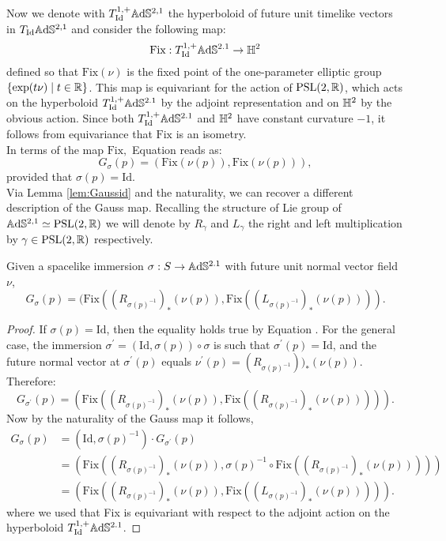 Now we denote with $T_{\text{Id}}^{1,+}\mathbb{A}\mathrm{d}\mathbb{S}^{2,1}$ the hyperboloid of future unit timelike vectors in $T_{\text{Id}}\mathbb{A}\mathrm{d}\mathbb{S}^{2,1}$ and consider the following map: 
\[
    \text{Fix}:T_{\text{Id}}^{1,+}\mathbb{A}\mathrm{d}\mathbb{S}^{2.1}\to\mathbb{H}^2
\]
defined so that $\text{Fix}(\nu)$ is the fixed point of the one-parameter elliptic group $\{\exp(t\nu)\;|\;t\in\mathbb{R}\}$. This map is equivariant for the action of $\text{PSL}(2,\mathbb{R})$, which acts on the hyperboloid $T_{\text{Id}}^{1,+}\mathbb{A}\mathrm{d}\mathbb{S}^{2.1}$ by the adjoint representation and on $\mathbb{H}^2$ by the obvious action. Since both $T_{\text{Id}}^{1,+}\mathbb{A}\mathrm{d}\mathbb{S}^{2.1}$ and $\mathbb{H}^2$ have constant curvature $-1$, it follows from equivariance that $\text{Fix}$ is an isometry.  \\
In terms of the map $\text{Fix},$ Equation  reads as: 
\begin{equation}\label{eq:Gaussfix}
    G_\sigma(p)=(\text{Fix}(\nu(p)),\text{Fix}(\nu(p))),
\end{equation}
provided that $\sigma(p)=\text{Id}.$\\ Via Lemma \ref{lem:Gaussid} and the naturality, we can recover a different description of the Gauss map. Recalling the structure of Lie group of $\mathbb{A}\mathrm{d}\mathbb{S}^{2,1}\simeq\text{PSL}(2,\mathbb{R})$ we will denote by $R_{\gamma } $ and $L_{\gamma} $ the right and left multiplication by $\gamma\in\text{PSL}(2,\mathbb{R})$ respectively. 

\begin{lemma}
    Given a spacelike immersion $\sigma: S\to \mathbb{A}\mathrm{d}\mathbb{S}^{2.1}$ with future unit normal vector field $\nu$,
    \[
        G_\sigma(p)=(\text{Fix}((R_{\sigma(p)^{-1}})_* (\nu(p)),\text{Fix}((L_{\sigma(p)^{-1}})_* (\nu(p)))).
    \]
\end{lemma}

\begin{proof}
    If $\sigma(p)=\text{Id}$, then the equality holds true by Equation . For the general case, the immersion $\sigma^{\prime} =(\text{Id},\sigma(p))\circ\sigma$ is such that $\sigma^{\prime}(p)=\text{Id}$, and the future normal vector at $\sigma^{\prime} (p)$ equals $\nu^{\prime} (p)=(R_{\sigma(p)^{-1}}))_{\ast} (\nu(p))$. Therefore: 
    \[
        G_{\sigma^{\prime} }(p)=(\text{Fix}((R_{\sigma(p)^{-1}})_{\ast} (\nu(p)),\text{Fix}((R_{\sigma(p)^{-1}})_{\ast} (\nu(p))))).
    \]
    Now by the naturality of the Gauss map it follows,     
    \begin{align*}
        G_\sigma(p)&=(\text{Id},\sigma(p)^{-1})\cdot G_{\sigma^{\prime}}(p) \\
        &=(\text{Fix}((R_{\sigma(p)^{-1}})_{\ast} (\nu(p)),\sigma(p)^{-1}\circ\text{Fix}((R_{\sigma(p)^{-1}})_{\ast} (\nu(p))))) \\
        &=(\text{Fix}((R_{\sigma(p)^{-1}})_{\ast} (\nu(p)),\text{Fix}((L_{\sigma(p)^{-1}})_{\ast} (\nu(p))))).
    \end{align*}
    where we used that Fix is equivariant with respect to the adjoint action on the hyperboloid $T_{\text{Id}}^{1,+}\mathbb{A}\mathrm{d}\mathbb{S}^{2.1}$.
\end{proof}

